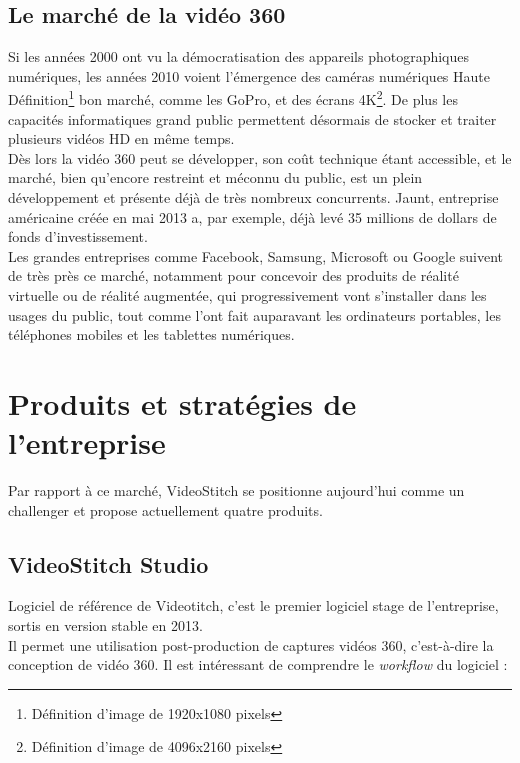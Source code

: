 \subsection{Le marché de la vidéo 360}
Si les années 2000 ont vu la démocratisation des appareils photographiques numériques,
les années 2010 voient l'émergence des caméras numériques Haute 
Définition\footnote{Définition d'image de 1920x1080 pixels} bon marché, comme les GoPro,
et des écrans 4K\footnote{Définition d'image de 4096x2160 pixels}. De plus les capacités
informatiques grand public permettent désormais de stocker et traiter plusieurs 
vidéos HD en même temps.\\
Dès lors la vidéo 360 peut se développer, son coût technique
étant accessible, et le marché, bien qu'encore restreint et méconnu du public,
est un plein développement et présente déjà de très nombreux concurrents. Jaunt,
entreprise américaine créée en mai 2013 a, par exemple, déjà levé 35 millions
de dollars de fonds d'investissement\cite{jaunt-fundings}.\\
Les grandes entreprises comme Facebook\cite{facebook-vr}, Samsung\cite{samsung-vr}, 
Microsoft\cite{microsoft-vr} ou Google\cite{google-vr} suivent de
très près ce marché, notamment pour concevoir des produits de réalité virtuelle 
ou de réalité augmentée, qui progressivement vont s'installer dans les usages
du public, tout comme l'ont fait auparavant les ordinateurs portables, les téléphones mobiles
et les tablettes numériques.\\

\section{Produits et stratégies de l'entreprise}
Par rapport à ce marché, VideoStitch se positionne aujourd'hui comme un challenger
et propose actuellement quatre produits\cite{videostitch-products}.
\subsection{VideoStitch Studio}
\label{videostitch-studio}
Logiciel de référence de Videotitch, c'est le premier logiciel stage de l'entreprise,
sortis en version stable en 2013.\\
Il permet une utilisation post-production de captures vidéos 360, c'est-à-dire 
la conception de vidéo 360. Il est intéressant de comprendre le \textit{workflow}
du logiciel : 
